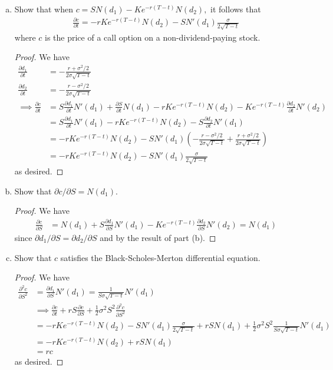 \documentclass{article}
\begin{document}
\begin{itemize}
\begin{enumerate}[(a)]
			\item Show that when $c=SN(d_1)-Ke^{-r(T-t)}N(d_2),$ it follows that
				\begin{align*}
					\frac{\partial c}{\partial t}=-rKe^{-r(T-t)}N(d_2)-SN'(d_1)\frac{\sigma}{2\sqrt{T-t}}
				\end{align*}
				where $c$ is the price of a call option on a non-dividend-paying stock.
				\begin{proof}
					We have
					\begin{align*}
						\frac{\partial d_1}{\partial t} &= -\frac{r+\sigma^2/2}{2\sigma\sqrt{T-t}} \\
						\frac{\partial d_2}{\partial t} &= -\frac{r-\sigma^2/2}{2\sigma\sqrt{T-t}} \\
						\implies \frac{\partial c}{\partial t} &= S\frac{\partial d_1}{\partial t}N'(d_1) + \frac{\partial S}{\partial t}N(d_1)- rKe^{-r(T-t)}N(d_2) - Ke^{-r(T-t)}\frac{\partial d_2}{\partial t}N'(d_2) \\
						&= S\frac{\partial d_1}{\partial t}N'(d_1) - rKe^{-r(T-t)} N(d_2) - S\frac{\partial d_2}{\partial t} N'(d_1) \\
						&= -rKe^{-r(T-t)}N(d_2) - SN'(d_1) \left( -\frac{r-\sigma^2/2}{2\sigma\sqrt{T-t}} + \frac{r+\sigma^2/2}{2\sigma\sqrt{T-t}} \right) \\
						&= -rKe^{-r(T-t)}N(d_2) - SN'(d_1)\frac{\sigma}{2\sqrt{T-t}}
					\end{align*}
					as desired.
				\end{proof}

			\item Show that $\partial c/\partial S=N(d_1).$
				\begin{proof}
					We have
					\begin{align*}
						\frac{\partial c}{\partial S} &= N(d_1) + S\frac{\partial d_1}{\partial S} N'(d_1) - Ke^{-r(T-t)}\frac{\partial d_2}{\partial S} N'(d_2) = N(d_1)
					\end{align*}
					since $\partial d_1/\partial S = \partial d_2/\partial S$ and by the result of part (b).
				\end{proof}

			\item Show that $c$ satisfies the Black-Scholes-Merton differential equation.
				\begin{proof}
					We have
					\begin{align*}
						\frac{\partial ^2 c}{\partial S^2} &= \frac{\partial d_1}{\partial S} N'(d_1) = \frac{1}{S\sigma\sqrt{T-t}} N'(d_1) \\
						&\implies \frac{\partial c}{\partial t} + rS\frac{\partial c}{\partial S} + \frac{1}{2}\sigma^2 S^2 \frac{\partial^2 c}{\partial S^2}\\
						&= -rKe^{-r(T-t)}N(d_2)-SN'(d_1)\frac{\sigma}{2\sqrt{T-t}}+ rSN(d_1) + \frac{1}{2}\sigma^2S^2 \frac{1}{S\sigma\sqrt{T-t}}N'(d_1) \\
						&= -rKe^{-r(T-t)}N(d_2) + rSN(d_1) \\
						&= rc
					\end{align*}
					as desired.
				\end{proof}


\end{enumerate}
\end{itemize}
\end{document}
